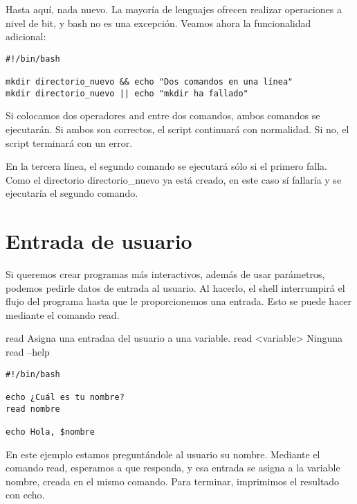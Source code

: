 Hasta aquí, nada nuevo. La mayoría de lenguajes ofrecen realizar operaciones a nivel de bit, y bash no es una excepción. Veamos ahora la funcionalidad adicional:

\begin{tcolorbox-code}
\begin{lstlisting}
#!/bin/bash

mkdir directorio_nuevo && echo "Dos comandos en una línea"
mkdir directorio_nuevo || echo "mkdir ha fallado"
\end{lstlisting}
\end{tcolorbox-code}

Si colocamos dos operadores and entre dos comandos, ambos comandos se ejecutarán. Si ambos son correctos, el script continuará con normalidad. Si no, el script terminará con un error.

En la tercera línea, el segundo comando se ejecutará sólo si el primero falla. Como el directorio directorio\_nuevo ya está creado, en este caso sí fallaría y se ejecutaría el segundo comando.

\section{Entrada de usuario}

Si queremos crear programas más interactivos, además de usar parámetros, podemos pedirle datos de entrada al usuario. Al hacerlo, el shell interrumpirá el flujo del programa hasta que le proporcionemos una entrada. Esto se puede hacer mediante el comando read.

\begin{command-info}
{read}
{Asigna una entradaa del usuario a una variable.}
{read <variable>}
{Ninguna}
{read --help}
\end{command-info}

\begin{tcolorbox-code}
\begin{lstlisting}
#!/bin/bash

echo ¿Cuál es tu nombre?
read nombre

echo Hola, $nombre
\end{lstlisting}
\end{tcolorbox-code}

En este ejemplo estamos preguntándole al usuario su nombre. Mediante el comando read, esperamos a que responda, y esa entrada se asigna a la variable nombre, creada en el mismo comando. Para terminar, imprimimos el resultado con echo.

